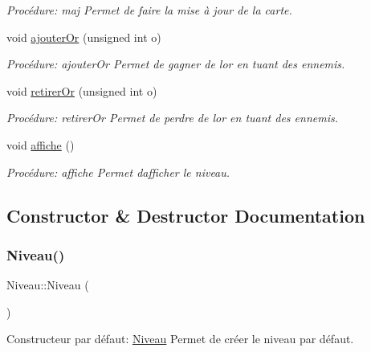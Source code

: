 \begin{DoxyCompactItemize}
\begin{DoxyCompactList}\small\item\em Procédure\+: maj Permet de faire la mise à jour de la carte. \end{DoxyCompactList}\item 
void \hyperlink{classNiveau_aca63b4ff95491069ebf5a8931ffc6d03}{ajouter\+Or} (unsigned int o)
\begin{DoxyCompactList}\small\item\em Procédure\+: ajouter\+Or Permet de gagner de l\textquotesingle{}or en tuant des ennemis. \end{DoxyCompactList}\item 
void \hyperlink{classNiveau_a3192b7514716cfddac9ff465f9ad1f2f}{retirer\+Or} (unsigned int o)
\begin{DoxyCompactList}\small\item\em Procédure\+: retirer\+Or Permet de perdre de l\textquotesingle{}or en tuant des ennemis. \end{DoxyCompactList}\item 
void \hyperlink{classNiveau_a945a71fd635f9ab1e15dbae04afa5e5d}{affiche} ()
\begin{DoxyCompactList}\small\item\em Procédure\+: affiche Permet d\textquotesingle{}afficher le niveau. \end{DoxyCompactList}\end{DoxyCompactItemize}


\subsection{Constructor \& Destructor Documentation}
\mbox{\label{classNiveau_abf99be59a575d462a25c4ade5c124431}} 
\subsubsection{\texorpdfstring{Niveau()}{Niveau()}\hspace{0.1cm}{\footnotesize\ttfamily [1/2]}}
{\footnotesize\ttfamily Niveau\+::\+Niveau (\begin{DoxyParamCaption}{ }\end{DoxyParamCaption})}



Constructeur par défaut\+: \hyperlink{classNiveau}{Niveau} Permet de créer le niveau par défaut. 


